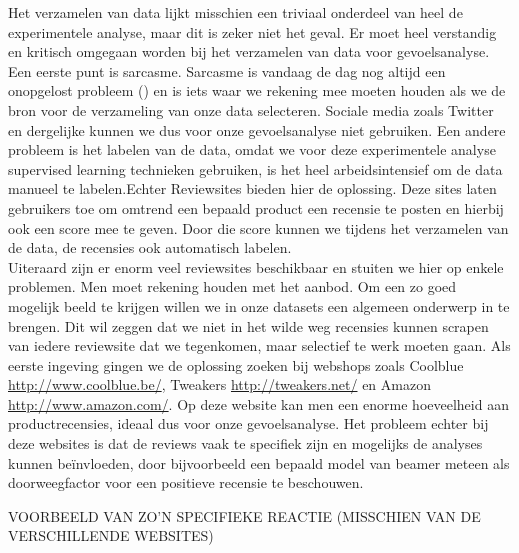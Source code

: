 Het verzamelen van data lijkt misschien een triviaal onderdeel van heel de experimentele analyse, maar dit is zeker niet het geval. Er moet heel verstandig en kritisch omgegaan worden bij het verzamelen van data voor gevoelsanalyse. Een eerste punt is sarcasme. Sarcasme is vandaag de dag nog altijd een onopgelost probleem (\cite{liebrecht2013perfect}) en is iets waar we rekening mee moeten houden als we de bron voor de verzameling van onze data selecteren. Sociale media zoals Twitter en dergelijke kunnen we dus voor onze gevoelsanalyse niet gebruiken. Een andere probleem is het labelen van de data, omdat we voor deze experimentele analyse supervised learning technieken gebruiken, is het heel arbeidsintensief om de data manueel te labelen.Echter Reviewsites bieden hier de oplossing. Deze sites laten gebruikers toe om omtrend een bepaald product een recensie te posten en hierbij ook een score mee te geven. Door die score kunnen we tijdens het verzamelen van de data, de recensies ook automatisch labelen.\\

Uiteraard zijn er enorm veel reviewsites beschikbaar en stuiten we hier op enkele problemen. Men moet rekening houden met het aanbod. Om een zo goed mogelijk beeld te krijgen willen we in onze datasets een algemeen onderwerp in te brengen. Dit wil zeggen dat we niet in het wilde weg recensies kunnen scrapen van iedere reviewsite dat we tegenkomen, maar selectief te werk moeten gaan. Als eerste ingeving gingen we de oplossing zoeken bij webshops zoals Coolblue \url{http://www.coolblue.be/}, Tweakers \url{http://tweakers.net/} en Amazon \url{http://www.amazon.com/}. Op deze website kan men een enorme hoeveelheid aan productrecensies, ideaal dus voor onze gevoelsanalyse. Het probleem echter bij deze websites is dat de reviews vaak te specifiek zijn en mogelijks de analyses kunnen be\"invloeden, door bijvoorbeeld een bepaald model van beamer meteen als doorweegfactor voor een positieve recensie te beschouwen.


VOORBEELD VAN ZO'N SPECIFIEKE REACTIE (MISSCHIEN VAN DE VERSCHILLENDE WEBSITES)

